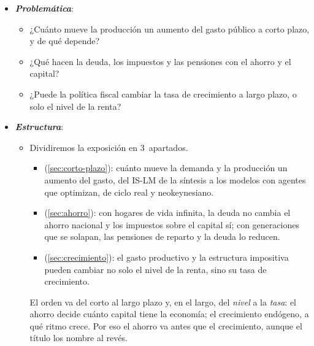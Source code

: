 \documentclass[11pt]{article}
\begin{document}
\begin{itemize}
\item \textbf{\emph{Problemática}}:
  \begin{itemize}
  \item ¿Cuánto mueve la producción un aumento del gasto público a corto plazo, y de qué depende?
  \item ¿Qué hacen la deuda, los impuestos y las pensiones con el ahorro y el capital?
  \item ¿Puede la política fiscal cambiar la tasa de crecimiento a largo plazo, o solo el nivel de la renta?
  \end{itemize}

\item \textbf{\emph{Estructura}}:
  \begin{itemize}
  \item Dividiremos la exposición en 3~apartados.
  \begin{itemize}
  \item {} (\ref{sec:corto-plazo}): cuánto mueve la demanda y la producción un aumento del gasto, del IS-LM de la síntesis a los modelos con agentes que optimizan, de ciclo real y neokeynesiano.
  \item {} (\ref{sec:ahorro}): con hogares de vida infinita, la deuda no cambia el ahorro nacional y los impuestos sobre el capital sí; con generaciones que se solapan, las pensiones de reparto y la deuda lo reducen.
  \item {} (\ref{sec:crecimiento}): el gasto productivo y la estructura impositiva pueden cambiar no solo el nivel de la renta, sino su tasa de crecimiento.
  \end{itemize}
  El orden va del corto al largo plazo y, en el largo, del \emph{nivel} a la \emph{tasa}: el ahorro decide cuánto capital tiene la economía; el crecimiento endógeno, a qué ritmo crece. Por eso el ahorro va antes que el crecimiento, aunque el título los nombre al revés.
  \end{itemize}
\end{itemize}
\end{document}
